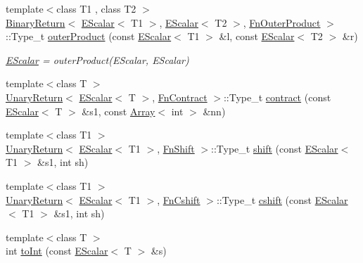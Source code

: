 \begin{DoxyCompactItemize}
{\footnotesize template$<$class T1 , class T2 $>$ }\\\mbox{\hyperlink{structENSEM_1_1BinaryReturn}{Binary\+Return}}$<$ \mbox{\hyperlink{classENSEM_1_1EScalar}{E\+Scalar}}$<$ T1 $>$, \mbox{\hyperlink{classENSEM_1_1EScalar}{E\+Scalar}}$<$ T2 $>$, \mbox{\hyperlink{structENSEM_1_1FnOuterProduct}{Fn\+Outer\+Product}} $>$\+::Type\+\_\+t \mbox{\hyperlink{group__escalar_gaf54c1015e882e21da36323ae571504dc}{outer\+Product}} (const \mbox{\hyperlink{classENSEM_1_1EScalar}{E\+Scalar}}$<$ T1 $>$ \&l, const \mbox{\hyperlink{classENSEM_1_1EScalar}{E\+Scalar}}$<$ T2 $>$ \&r)
\begin{DoxyCompactList}\small\item\em \mbox{\hyperlink{classENSEM_1_1EScalar}{E\+Scalar}} = outer\+Product(\+E\+Scalar, E\+Scalar) \end{DoxyCompactList}\item 
{\footnotesize template$<$class T $>$ }\\\mbox{\hyperlink{structENSEM_1_1UnaryReturn}{Unary\+Return}}$<$ \mbox{\hyperlink{classENSEM_1_1EScalar}{E\+Scalar}}$<$ T $>$, \mbox{\hyperlink{structENSEM_1_1FnContract}{Fn\+Contract}} $>$\+::Type\+\_\+t \mbox{\hyperlink{group__escalar_ga6c04652cc005e69e9785effa182a8436}{contract}} (const \mbox{\hyperlink{classENSEM_1_1EScalar}{E\+Scalar}}$<$ T $>$ \&s1, const \mbox{\hyperlink{classXMLArray_1_1Array}{Array}}$<$ int $>$ \&nn)
\item 
{\footnotesize template$<$class T1 $>$ }\\\mbox{\hyperlink{structENSEM_1_1UnaryReturn}{Unary\+Return}}$<$ \mbox{\hyperlink{classENSEM_1_1EScalar}{E\+Scalar}}$<$ T1 $>$, \mbox{\hyperlink{structENSEM_1_1FnShift}{Fn\+Shift}} $>$\+::Type\+\_\+t \mbox{\hyperlink{group__escalar_gaeaac3a9b82b6d6c8f0ec25efb3242cfe}{shift}} (const \mbox{\hyperlink{classENSEM_1_1EScalar}{E\+Scalar}}$<$ T1 $>$ \&s1, int sh)
\item 
{\footnotesize template$<$class T1 $>$ }\\\mbox{\hyperlink{structENSEM_1_1UnaryReturn}{Unary\+Return}}$<$ \mbox{\hyperlink{classENSEM_1_1EScalar}{E\+Scalar}}$<$ T1 $>$, \mbox{\hyperlink{structENSEM_1_1FnCshift}{Fn\+Cshift}} $>$\+::Type\+\_\+t \mbox{\hyperlink{group__escalar_ga4a9bfa7287ccf8fef9605aa9e9a44884}{cshift}} (const \mbox{\hyperlink{classENSEM_1_1EScalar}{E\+Scalar}}$<$ T1 $>$ \&s1, int sh)
\item 
{\footnotesize template$<$class T $>$ }\\int \mbox{\hyperlink{group__escalar_ga332b1b685c28f8bdbf099f3e32016ad2}{to\+Int}} (const \mbox{\hyperlink{classENSEM_1_1EScalar}{E\+Scalar}}$<$ T $>$ \&s)

\end{DoxyCompactItemize}
